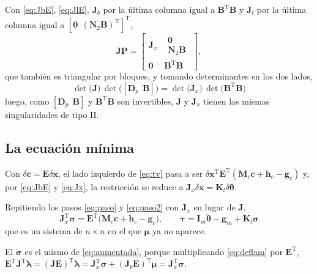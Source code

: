 \documentclass[11pt]{article}
\newcommand{\T}{^{\mathrm{T}}}
\newcommand{\Nmat}{\mathbf{N}}
\newcommand{\lam}{\boldsymbol{\lambda}}
\newcommand{\muv}{\boldsymbol{\mu}}
\newcommand{\sig}{\boldsymbol{\sigma}}
\newcommand{\cdd}{\ddot{\mathbf{c}}}
\newcommand{\thv}{\boldsymbol{\theta}}
\newcommand{\tauv}{\boldsymbol{\tau}}
\begin{document}
Con \eqref{eq:JbE}, \eqref{eq:JlE}, $\mathbf{J}_b$ por la última columna igual a $\mathbf{B}\T\mathbf{B}$ y $\mathbf{J}_l$ por la última columna igual a $[\mathbf{0}\ \ (\Nmat_2\mathbf{B})\T]\T$,
\begin{equation}
\mathbf{J}\mathbf{P}=
\begin{bmatrix}
\mathbf{J}_x & \begin{matrix}\mathbf{0}\\ \Nmat_2\mathbf{B}\end{matrix}\\
\mathbf{0} & \mathbf{B}\T\mathbf{B}
\end{bmatrix},
\label{eq:JP}
\end{equation}
que también es triangular por bloques, y tomando determinantes en los dos lados,
\begin{equation}
\boxed{\ \det\!\big(\mathbf{J}\big)\,\det\!\big([\mathbf{D}_p\ \ \mathbf{B}]\big)=\det\!\big(\mathbf{J}_x\big)\,\det\!\big(\mathbf{B}\T\mathbf{B}\big)\ }
\label{eq:detJx}
\end{equation}
luego, como $[\mathbf{D}_p\ \ \mathbf{B}]$ y $\mathbf{B}\T\mathbf{B}$ son invertibles, $\mathbf{J}$ y $\mathbf{J}_x$ tienen las mismas singularidades de tipo II.

\subsection{La ecuación mínima}

Con $\delta\mathbf{c}=\mathbf{E}\delta\mathbf{x}$, el lado izquierdo de \eqref{eq:tv} pasa a ser $\delta\mathbf{x}\T\mathbf{E}\T(\mathbf{M}_c\cdd+\mathbf{h}_c-\mathbf{g}_c)$ y, por \eqref{eq:JbE} y \eqref{eq:Jx}, la restricción se reduce a $\mathbf{J}_x\delta\mathbf{x}=\mathbf{K}_l\delta\thv$.

Repitiendo los pasos \eqref{eq:paso} y \eqref{eq:paso2} con $\mathbf{J}_x$ en lugar de $\mathbf{J}$,
\begin{equation}
\boxed{\ \mathbf{J}_x\T\sig=\mathbf{E}\T\big(\mathbf{M}_c\cdd+\mathbf{h}_c-\mathbf{g}_c\big),
\qquad
\tauv=\mathbf{I}_m\ddot{\thv}-\mathbf{g}_m+\mathbf{K}_l\sig\ }
\label{eq:minima}
\end{equation}
que es un sistema de $n\times n$ en el que $\muv$ ya no aparece.

El $\sig$ es el mismo de \eqref{eq:aumentada}, porque multiplicando \eqref{eq:deflam} por $\mathbf{E}\T$, $\mathbf{E}\T\mathbf{J}\T\lam=(\mathbf{J}\mathbf{E})\T\lam=\mathbf{J}_x\T\sig+(\mathbf{J}_b\mathbf{E})\T\muv=\mathbf{J}_x\T\sig$.
\end{document}
